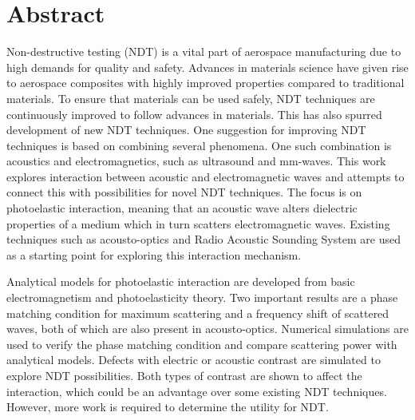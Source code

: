 \documentclass[11pt,twoside]{eitExjobb}
\begin{document}
	
	\newcommand{\addref}{\todo[color=red!40]{Citation needed!}}
	\newcommand{\todoext}[1]{\todo[inline, color=yellow]{#1}}
	\newcommand{\todoint}[2][]{\todo[#1]{#2}}
	
	\newcommand{\mrm}[1]{\mathrm{#1}}
	\newcommand{\eu}{\mrm{e}}
	\newcommand{\iu}{\mrm{i}}
	
	
	
	\MakeTitlePage  %
	
	\frontmatter    %
	
	\chapter*{Abstract}
	Non-destructive testing (NDT) is a vital part of aerospace manufacturing due to high demands for quality and safety. Advances in materials science have given rise to aerospace composites with highly improved properties compared to traditional materials. To ensure that materials can be used safely, NDT techniques are continuously improved to follow advances in materials. This has also spurred development of new NDT techniques. One suggestion for improving NDT techniques is based on combining several phenomena. One such combination is acoustics and electromagnetics, such as ultrasound and mm-waves. This work explores interaction between acoustic and electromagnetic waves and attempts to connect this with possibilities for novel NDT techniques. The focus is on photoelastic interaction, meaning that an acoustic wave alters dielectric properties of a medium which in turn scatters electromagnetic waves. Existing techniques such as acousto-optics and Radio Acoustic Sounding System are used as a starting point for exploring this interaction mechanism.
	
	Analytical models for photoelastic interaction are developed from basic electromagnetism and photoelasticity theory. Two important results are a phase matching condition for maximum scattering and a frequency shift of scattered waves, both of which are also present in acousto-optics. Numerical simulations are used to verify the phase matching condition and compare scattering power with analytical models. Defects with electric or acoustic contrast are simulated to explore NDT possibilities. Both types of contrast are shown to affect the interaction, which could be an advantage over some existing NDT techniques. However, more work is required to determine the utility for NDT.
	
\end{document}
